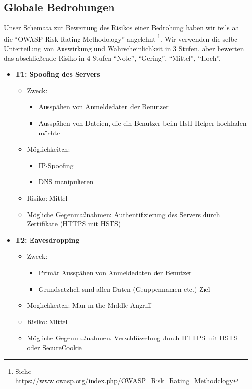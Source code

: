 \documentclass[12pt,DIV14,BCOR10mm,a4paper,parskip=half-,headsepline,headinclude,english,ngerman,bibliography=totocnumbered]{scrreprt}
\begin{document}
\subsection{Globale Bedrohungen}

Unser Schemata zur Bewertung des Risikos einer Bedrohung haben wir teils an die \enquote{OWASP Risk Rating Methodology} angelehnt \footnote{Siehe \url{https://www.owasp.org/index.php/OWASP_Risk_Rating_Methodology}}. Wir verwenden die selbe Unterteilung von Auswirkung und Wahrscheinlichkeit in 3 Stufen, aber bewerten das abschließende Risiko in 4 Stufen \enquote{Note}, \enquote{Gering}, \enquote{Mittel}, \enquote{Hoch}.

\begin{itemize}

  \hypertarget{threat1}{}
  \item \textbf{T1: Spoofing des Servers}
  \begin{itemize}
  \item Zweck:
  	\begin{itemize}
  		\item Ausspähen von Anmeldedaten der Benutzer
  		\item Ausspähen von Dateien, die ein Benutzer beim HsH-Helper hochladen möchte
  	\end{itemize}
  \item Möglichkeiten:
  	\begin{itemize}
  		\item IP-Spoofing
  		\item DNS manipulieren
  	\end{itemize}
  \item Risiko: Mittel
  \item Mögliche Gegenmaßnahmen: Authentifizierung des Servers durch Zertifikate (HTTPS mit HSTS)
  \end{itemize}

  \hypertarget{threat2}{}
  \item \textbf{T2: Eavesdropping}
  \begin{itemize}
  \item Zweck:
  	\begin{itemize}
  		\item Primär Ausspähen von Anmeldedaten der Benutzer
  		\item Grundsätzlich sind allen Daten (Gruppennamen etc.) Ziel
  	\end{itemize}
  \item Möglichkeiten: Man-in-the-Middle-Angriff
  \item Risiko: Mittel
  \item Mögliche Gegenmaßnahmen: Verschlüsselung durch HTTPS mit HSTS oder SecureCookie
  \end{itemize}


\end{itemize}
\end{document}
